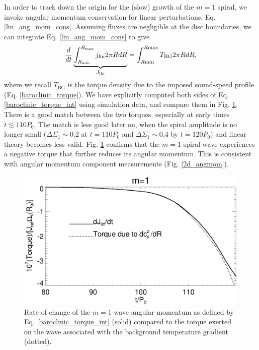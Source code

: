 In order to track down the origin for the (slow) growth of the
$m=1$ spiral, we invoke angular momentum conservation for linear
perturbations, Eq. \ref{lin_ang_mom_cons}. Assuming fluxes are
negligible at the disc boundaries, we can integrate
Eq. \ref{lin_ang_mom_cons} to give
\begin{align}\label{baroclinic_torque_int}
  \frac{d}{dt}\underbrace{\int_{R_\mathrm{min}}^{R_\mathrm{max}}j_\mathrm{lin}
    2\pi R dR}_{J_\mathrm{lin}} 
  =\int_{R\mathrm{min}}^{R\mathrm{max}}T_\mathrm{BG} 2\pi R dR, 
\end{align}
where we recall $T_\mathrm{BG}$ is the torque density due to the imposed
sound-speed profile (Eq. \ref{baroclinic_torque}). We have explicitly
computed both sides of Eq. \ref{baroclinic_torque_int} using
simulation data, and compare them in Fig. \ref{fargo_angmom_ex}. There
is a good match between the two torques, especially at early times
$t\lesssim110P_0$. The match is less good later on, when the spiral
amplitude is no longer small ($\Delta\Sigma_1\sim 0.2$ at $t=110P_0$
and $\Delta\Sigma_1\sim 0.4$ by $t=120P_0$) and linear theory becomes
less valid. Fig. \ref{fargo_angmom_ex} confirms that the $m=1$ spiral
wave experiences a negative torque that further reduces its angular
momentum. This is consistent with angular momentum component
measurements (Fig. \ref {2d_angmom}).  


\begin{figure}
  \includegraphics[width=\linewidth]{figures/m1_analysis_ang_fargo.ps} 
  \caption{Rate of change of the $m=1$ wave angular momentum as defined by
    Eq. \ref{baroclinic_torque_int} (solid) compared to the torque
    exerted on the wave associated with the background temperature
    gradient (dotted). 
    \label{fargo_angmom_ex}} 
\end{figure}

